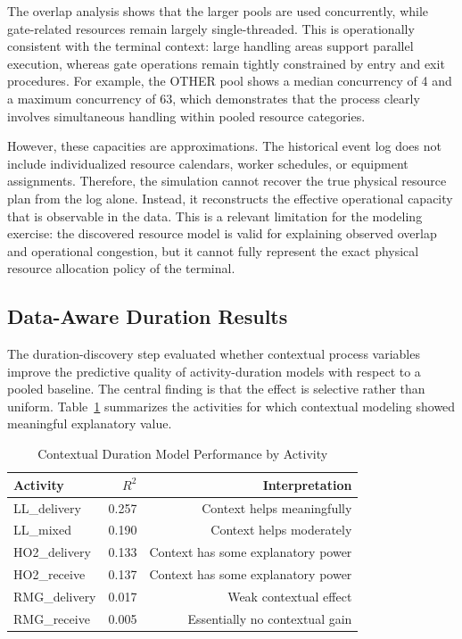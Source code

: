 The overlap analysis shows that the larger pools are used concurrently, while gate-related resources remain largely single-threaded. This is operationally consistent with the terminal context: large handling areas support parallel execution, whereas gate operations remain tightly constrained by entry and exit procedures. For example, the OTHER pool shows a median concurrency of 4 and a maximum concurrency of 63, which demonstrates that the process clearly involves simultaneous handling within pooled resource categories.

However, these capacities are approximations. The historical event log does not include individualized resource calendars, worker schedules, or equipment assignments. Therefore, the simulation cannot recover the true physical resource plan from the log alone. Instead, it reconstructs the effective operational capacity that is observable in the data. This is a relevant limitation for the modeling exercise: the discovered resource model is valid for explaining observed overlap and operational congestion, but it cannot fully represent the exact physical resource allocation policy of the terminal.

\subsection{Data-Aware Duration Results}
\label{sec:data_aware_duration_results}

The duration-discovery step evaluated whether contextual process variables improve the predictive quality of activity-duration models with respect to a pooled baseline. The central finding is that the effect is selective rather than uniform. Table~\ref{tab:data_aware_durations} summarizes the activities for which contextual modeling showed meaningful explanatory value.

\begin{table}[h!]
\centering
\caption{Contextual Duration Model Performance by Activity}
\label{tab:data_aware_durations}
\begin{tabular}{lrr}
\toprule
Activity & $R^2$ & Interpretation \\
\midrule
LL\_delivery & 0.257 & Context helps meaningfully \\
LL\_mixed & 0.190 & Context helps moderately \\
HO2\_delivery & 0.133 & Context has some explanatory power \\
HO2\_receive & 0.137 & Context has some explanatory power \\
RMG\_delivery & 0.017 & Weak contextual effect \\
RMG\_receive & 0.005 & Essentially no contextual gain \\
\bottomrule
\end{tabular}
\end{table}

